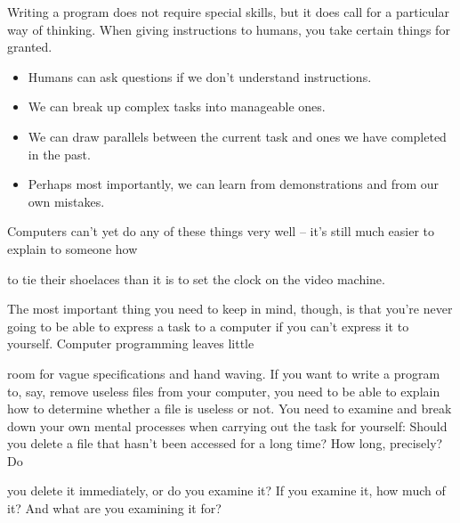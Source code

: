 \documentclass[a4paper,11pt]{book}
\begin{document}
\noindent 

\noindent Writing a program does not require special skills, but it does call for a particular way of thinking. When giving instructions to humans, you take certain things for granted.

\begin{itemize}

 \item Humans can ask questions if we don't understand instructions.

 \item We can break up complex tasks into manageable ones.

 \item We can draw parallels between the current task and ones we have completed in the past.

 \item Perhaps most importantly, we can learn from demonstrations and from our own mistakes.

\end{itemize} 

\noindent  

\noindent  

\noindent  

\noindent 

\noindent 

\noindent Computers can't yet do any of these things very well -- it's still much easier to explain to someone how

\noindent to tie their shoelaces than it is to set the clock on the video machine.

\noindent 

\noindent The most important thing you need to keep in mind, though, is that you're never going to be able to express a task to a computer if you can't express it to yourself. Computer programming leaves little

\noindent room for vague specifications and hand waving. If you want to write a program to, say, remove useless files from your computer, you need to be able to explain how to determine whether a file is useless or not. You need to examine and break down your own mental processes when carrying out the task for yourself: Should you delete a file that hasn't been accessed for a long time? How long, precisely? Do

\noindent you delete it immediately, or do you examine it? If you examine it, how much of it? And what are you examining it for?

\noindent 
\end{document}

